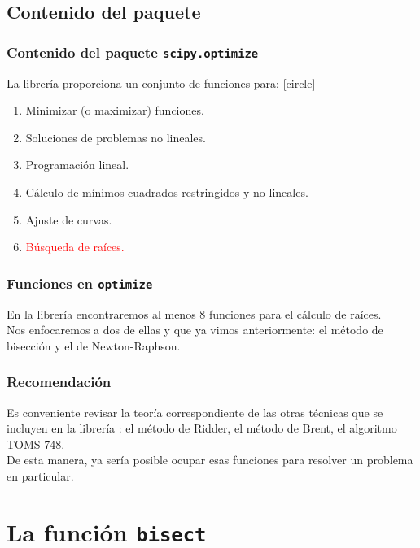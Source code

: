 \subsection*{Contenido del paquete}
\begin{frame}
\frametitle{Contenido del paquete \texttt{scipy.optimize}}
La librería  proporciona un conjunto de funciones para:
[circle]
\begin{enumerate}[<+->]
\item Minimizar (o maximizar) funciones.
\item Soluciones de problemas no lineales.
\item Programación lineal.
\item Cálculo de mínimos cuadrados restringidos y no lineales.
\item Ajuste de curvas.
\item \textcolor{red}{Búsqueda de raíces.}
\end{enumerate}
\end{frame}
\begin{frame}
\frametitle{Funciones en \texttt{optimize}}
En la librería  encontraremos al menos $8$ funciones para el cálculo de raíces.
\\
\bigskip
Nos enfocaremos a dos de ellas y que ya vimos anteriormente: el método de bisección y el de Newton-Raphson.
\end{frame}
\begin{frame}
\frametitle{Recomendación}
Es conveniente revisar la teoría correspondiente de las otras técnicas que se incluyen en la librería : el método de Ridder, el método de Brent, el algoritmo TOMS 748.
\\
\bigskip
De esta manera, ya sería posible ocupar esas funciones para resolver un problema en particular.
\end{frame}
\section{La función \texttt{bisect}}
